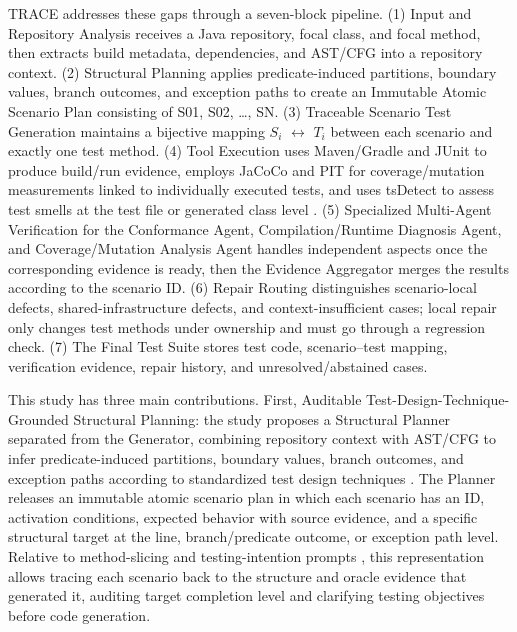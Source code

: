 \documentclass[pdflatex,sn-basic,Numbered,iicol]{sn-jnl}
\begin{document}
TRACE addresses these gaps through a seven-block pipeline. (1) Input and Repository Analysis receives a Java repository, focal class, and focal method, then extracts build metadata, dependencies, and AST/CFG into a repository context. (2) Structural Planning applies predicate-induced partitions, boundary values, branch outcomes, and exception paths to create an Immutable Atomic Scenario Plan consisting of S01, S02, \ldots{}, SN. (3) Traceable Scenario Test Generation maintains a bijective mapping $S_i$ \ensuremath{\leftrightarrow} $T_i$ between each scenario and exactly one test method. (4) Tool Execution uses Maven/Gradle and JUnit to produce build/run evidence, employs JaCoCo and PIT for coverage/mutation measurements linked to individually executed tests, and uses tsDetect to assess test smells at the test file or generated class level \cite{bib35,bib33,bib34,bib25}. (5) Specialized Multi-Agent Verification for the Conformance Agent, Compilation/Runtime Diagnosis Agent, and Coverage/Mutation Analysis Agent handles independent aspects once the corresponding evidence is ready, then the Evidence Aggregator merges the results according to the scenario ID. (6) Repair Routing distinguishes scenario-local defects, shared-infrastructure defects, and context-insufficient cases; local repair only changes test methods under ownership and must go through a regression check. (7) The Final Test Suite stores test code, scenario--test mapping, verification evidence, repair history, and unresolved/abstained cases.

This study has three main contributions. First, Auditable Test-Design-Technique-Grounded Structural Planning: the study proposes a Structural Planner separated from the Generator, combining repository context with AST/CFG to infer predicate-induced partitions, boundary values, branch outcomes, and exception paths according to standardized test design techniques \cite{bib30}. The Planner releases an immutable atomic scenario plan in which each scenario has an ID, activation conditions, expected behavior with source evidence, and a specific structural target at the line, branch/predicate outcome, or exception path level. Relative to method-slicing and testing-intention prompts \cite{bib6,bib7}, this representation allows tracing each scenario back to the structure and oracle evidence that generated it, auditing target completion level and clarifying testing objectives before code generation.
\end{document}
